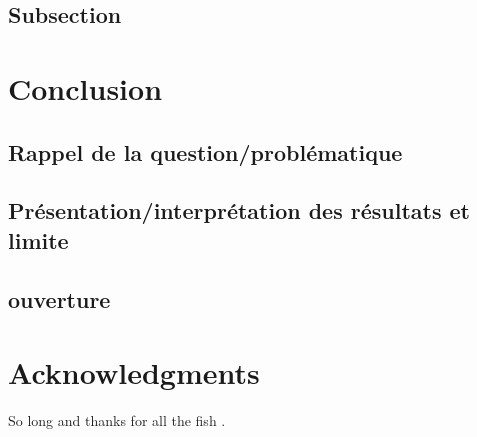 \documentclass[fleqn,10pt]{SelfArx} %
\begin{document}
\subsection{Subsection}

\lipsum[15-23] %


\section{Conclusion}
\subsection{Rappel de la question/problématique}
\subsection{Présentation/interprétation des résultats et limite}
\subsection{ouverture}

\section*{Acknowledgments} %


So long and thanks for all the fish \cite{Figueredo:2009dg}.




\end{document}
